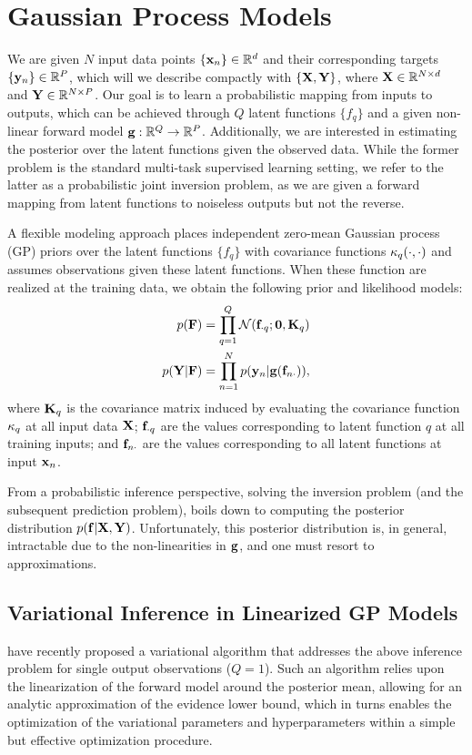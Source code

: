 \section{Gaussian Process Models}
We are given $N$ input data points $ \{ \mathbf{x}_n  \} \in \mathbb{R}^{d}$ and their corresponding  
targets $\{ \mathbf{y}_n  \} \in \mathbb{R}^{P}$, which will  we describe compactly with $\left\{{\mathbf{X}, \mathbf{Y}}\right\}$,
where $\mathbf{X} \in \mathbb{R}^{N \times d}$  and $\mathbf{Y} \in \mathbb{R}^{N \times P}$. Our goal is 
to learn a probabilistic mapping from inputs to outputs, which can be achieved through $Q$ latent  functions $\{ f_q \}$ and a given non-linear forward model $\mathbf{g} : \mathbb{R}^{Q} \to \mathbb{R}^{P}$. Additionally, we are interested in estimating the posterior over the latent functions given the observed data. 
While the former problem  is the standard multi-task supervised learning setting, we refer 
to the latter  as a probabilistic joint inversion problem, as we are given a forward mapping from 
latent functions to noiseless outputs but not the reverse. 

A  flexible modeling approach places independent zero-mean Gaussian process (GP) priors over 
the latent functions $\{ f_q \}$ with covariance functions $\kappa_q(\cdot, \cdot)$ and assumes
 \iid observations given these latent functions. When these function are realized at the training data,
we obtain the following prior and likelihood models:
\begin{align}
	\label{eq:gp-model-1}
	p(\mathbf{F})  &=  \prod_{q=1}^{Q} \mathcal{N}(\mathbf{f}_{\cdot q}; \mathbf{0}, \mathbf{K}_q) \\
	\label{eq:gp-model-2}	
	p(\mathbf{Y} | \mathbf{F}) &= \prod_{n=1}^N p(\mathbf{y}_n | \mathbf{g} ( \mathbf{f}_{n \cdot} )) \text{,}
\end{align}
where $\mathbf{K}_q$ is the covariance matrix induced by evaluating  the covariance 
function $\kappa_q$ at all input data $\mathbf{X}$; $\mathbf{f}_{\cdot q}$ are  the values 
corresponding to latent function $q$ at all training inputs; 
and $\mathbf{f}_{n \cdot}$ are  the values corresponding to all latent functions at input $\mathbf{x}_n$. 

From a probabilistic inference perspective, solving the inversion problem (and the 
subsequent prediction problem), boils down to computing the posterior distribution 
$p(\mathbf{f} | \mathbf{X}, \mathbf{Y})$. Unfortunately, this posterior distribution is, in general, 
intractable due to the non-linearities in $\mathbf{g}$, and one must resort to approximations.
%
\subsection{Variational Inference in Linearized GP Models}
\citet{steinberg-bonilla-nips-2014} have recently proposed a variational  algorithm that
addresses the above inference problem for single output observations ($Q=1$).  
Such an algorithm relies upon the linearization of the forward model around the posterior 
mean, allowing for an analytic approximation of the evidence lower bound, which in turns 
enables the optimization of the variational parameters and hyperparameters within a simple 
but effective optimization procedure.  

